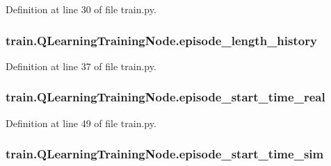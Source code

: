 Definition at line 30 of file train.\+py.

\subsubsection[{\texorpdfstring{episode\+\_\+length\+\_\+history}{episode_length_history}}]{\setlength{\rightskip}{0pt plus 5cm}train.\+Q\+Learning\+Training\+Node.\+episode\+\_\+length\+\_\+history}\hypertarget{classtrain_1_1_q_learning_training_node_af81cfd1d0306828d0ff901faf85df6b3}{}\label{classtrain_1_1_q_learning_training_node_af81cfd1d0306828d0ff901faf85df6b3}


Definition at line 37 of file train.\+py.

\subsubsection[{\texorpdfstring{episode\+\_\+start\+\_\+time\+\_\+real}{episode_start_time_real}}]{\setlength{\rightskip}{0pt plus 5cm}train.\+Q\+Learning\+Training\+Node.\+episode\+\_\+start\+\_\+time\+\_\+real}\hypertarget{classtrain_1_1_q_learning_training_node_a8efbf39c7dcf595fb7c02121c66f9f53}{}\label{classtrain_1_1_q_learning_training_node_a8efbf39c7dcf595fb7c02121c66f9f53}


Definition at line 49 of file train.\+py.

\subsubsection[{\texorpdfstring{episode\+\_\+start\+\_\+time\+\_\+sim}{episode_start_time_sim}}]{\setlength{\rightskip}{0pt plus 5cm}train.\+Q\+Learning\+Training\+Node.\+episode\+\_\+start\+\_\+time\+\_\+sim}\hypertarget{classtrain_1_1_q_learning_training_node_aaba249fe751adb0b4167b350ee2ea7a1}{}\label{classtrain_1_1_q_learning_training_node_aaba249fe751adb0b4167b350ee2ea7a1}


